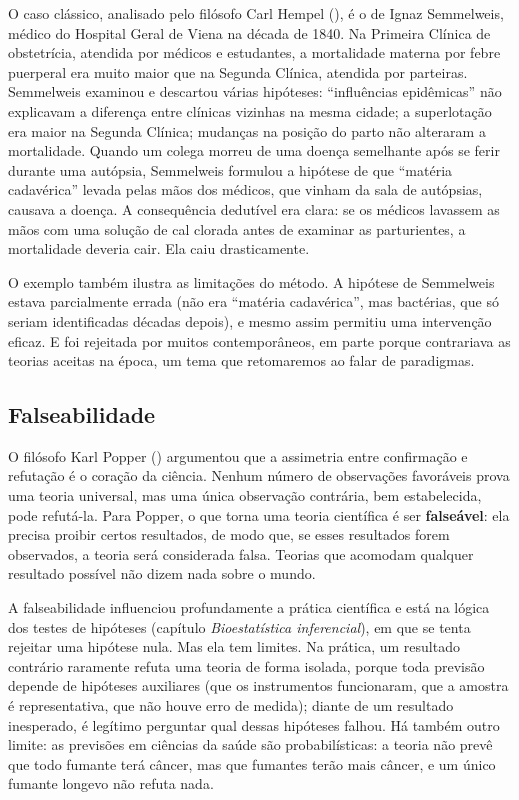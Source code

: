 \documentclass[
]{book}
\begin{document}
O caso clássico, analisado pelo filósofo Carl Hempel (), é o de Ignaz Semmelweis, médico do Hospital Geral de Viena na década de 1840. Na Primeira Clínica de obstetrícia, atendida por médicos e estudantes, a mortalidade materna por febre puerperal era muito maior que na Segunda Clínica, atendida por parteiras. Semmelweis examinou e descartou várias hipóteses: ``influências epidêmicas'' não explicavam a diferença entre clínicas vizinhas na mesma cidade; a superlotação era maior na Segunda Clínica; mudanças na posição do parto não alteraram a mortalidade. Quando um colega morreu de uma doença semelhante após se ferir durante uma autópsia, Semmelweis formulou a hipótese de que ``matéria cadavérica'' levada pelas mãos dos médicos, que vinham da sala de autópsias, causava a doença. A consequência dedutível era clara: se os médicos lavassem as mãos com uma solução de cal clorada antes de examinar as parturientes, a mortalidade deveria cair. Ela caiu drasticamente.

O exemplo também ilustra as limitações do método. A hipótese de Semmelweis estava parcialmente errada (não era ``matéria cadavérica'', mas bactérias, que só seriam identificadas décadas depois), e mesmo assim permitiu uma intervenção eficaz. E foi rejeitada por muitos contemporâneos, em parte porque contrariava as teorias aceitas na época, um tema que retomaremos ao falar de paradigmas.

\subsection{Falseabilidade}\label{falseabilidade}

O filósofo Karl Popper () argumentou que a assimetria entre confirmação e refutação é o coração da ciência. Nenhum número de observações favoráveis prova uma teoria universal, mas uma única observação contrária, bem estabelecida, pode refutá-la. Para Popper, o que torna uma teoria científica é ser \textbf{falseável}: ela precisa proibir certos resultados, de modo que, se esses resultados forem observados, a teoria será considerada falsa. Teorias que acomodam qualquer resultado possível não dizem nada sobre o mundo.

A falseabilidade influenciou profundamente a prática científica e está na lógica dos testes de hipóteses (capítulo \emph{Bioestatística inferencial}), em que se tenta rejeitar uma hipótese nula. Mas ela tem limites. Na prática, um resultado contrário raramente refuta uma teoria de forma isolada, porque toda previsão depende de hipóteses auxiliares (que os instrumentos funcionaram, que a amostra é representativa, que não houve erro de medida); diante de um resultado inesperado, é legítimo perguntar qual dessas hipóteses falhou. Há também outro limite: as previsões em ciências da saúde são probabilísticas: a teoria não prevê que todo fumante terá câncer, mas que fumantes terão mais câncer, e um único fumante longevo não refuta nada.
\end{document}
